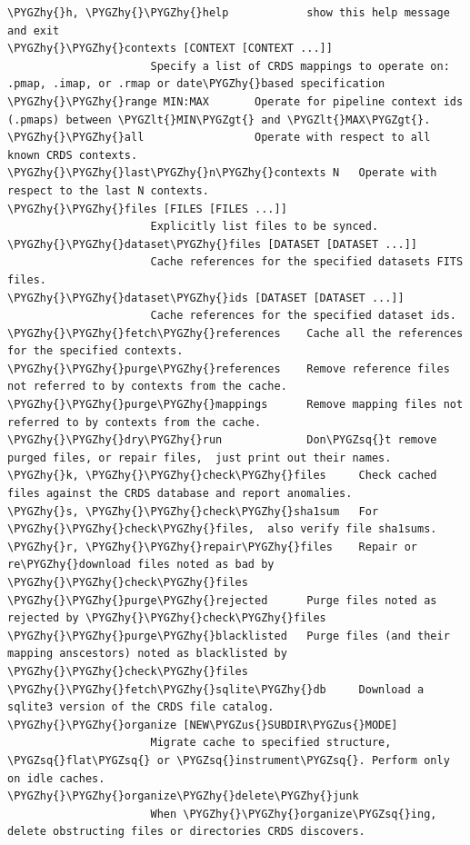 \documentclass[letterpaper,10pt,english]{sphinxmanual}
\def\PYGZus{\char`\_}
\def\PYGZlt{\char`\<}
\def\PYGZgt{\char`\>}
\def\PYGZhy{\char`\-}
\def\PYGZsq{\char`\'}
\renewcommand\PYGZsq{\textquotesingle}
\begin{document}
\begin{Verbatim}[commandchars=\\\{\}]
\PYGZhy{}h, \PYGZhy{}\PYGZhy{}help            show this help message and exit
\PYGZhy{}\PYGZhy{}contexts [CONTEXT [CONTEXT ...]]
                      Specify a list of CRDS mappings to operate on: .pmap, .imap, or .rmap or date\PYGZhy{}based specification
\PYGZhy{}\PYGZhy{}range MIN:MAX       Operate for pipeline context ids (.pmaps) between \PYGZlt{}MIN\PYGZgt{} and \PYGZlt{}MAX\PYGZgt{}.
\PYGZhy{}\PYGZhy{}all                 Operate with respect to all known CRDS contexts.
\PYGZhy{}\PYGZhy{}last\PYGZhy{}n\PYGZhy{}contexts N   Operate with respect to the last N contexts.
\PYGZhy{}\PYGZhy{}files [FILES [FILES ...]]
                      Explicitly list files to be synced.
\PYGZhy{}\PYGZhy{}dataset\PYGZhy{}files [DATASET [DATASET ...]]
                      Cache references for the specified datasets FITS files.
\PYGZhy{}\PYGZhy{}dataset\PYGZhy{}ids [DATASET [DATASET ...]]
                      Cache references for the specified dataset ids.
\PYGZhy{}\PYGZhy{}fetch\PYGZhy{}references    Cache all the references for the specified contexts.
\PYGZhy{}\PYGZhy{}purge\PYGZhy{}references    Remove reference files not referred to by contexts from the cache.
\PYGZhy{}\PYGZhy{}purge\PYGZhy{}mappings      Remove mapping files not referred to by contexts from the cache.
\PYGZhy{}\PYGZhy{}dry\PYGZhy{}run             Don\PYGZsq{}t remove purged files, or repair files,  just print out their names.
\PYGZhy{}k, \PYGZhy{}\PYGZhy{}check\PYGZhy{}files     Check cached files against the CRDS database and report anomalies.
\PYGZhy{}s, \PYGZhy{}\PYGZhy{}check\PYGZhy{}sha1sum   For \PYGZhy{}\PYGZhy{}check\PYGZhy{}files,  also verify file sha1sums.
\PYGZhy{}r, \PYGZhy{}\PYGZhy{}repair\PYGZhy{}files    Repair or re\PYGZhy{}download files noted as bad by \PYGZhy{}\PYGZhy{}check\PYGZhy{}files
\PYGZhy{}\PYGZhy{}purge\PYGZhy{}rejected      Purge files noted as rejected by \PYGZhy{}\PYGZhy{}check\PYGZhy{}files
\PYGZhy{}\PYGZhy{}purge\PYGZhy{}blacklisted   Purge files (and their mapping anscestors) noted as blacklisted by \PYGZhy{}\PYGZhy{}check\PYGZhy{}files
\PYGZhy{}\PYGZhy{}fetch\PYGZhy{}sqlite\PYGZhy{}db     Download a sqlite3 version of the CRDS file catalog.
\PYGZhy{}\PYGZhy{}organize [NEW\PYGZus{}SUBDIR\PYGZus{}MODE]
                      Migrate cache to specified structure, \PYGZsq{}flat\PYGZsq{} or \PYGZsq{}instrument\PYGZsq{}. Perform only on idle caches.
\PYGZhy{}\PYGZhy{}organize\PYGZhy{}delete\PYGZhy{}junk
                      When \PYGZhy{}\PYGZhy{}organize\PYGZsq{}ing, delete obstructing files or directories CRDS discovers.

\end{Verbatim}
\end{document}
